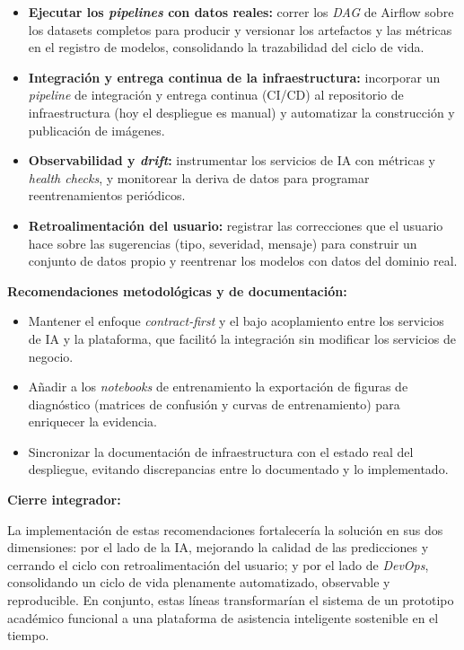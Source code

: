 \begin{itemize}\itemsep=1pt
    \item \textbf{Ejecutar los \textit{pipelines} con datos reales:} correr los \textit{DAG} de Airflow sobre los datasets completos para producir y versionar los artefactos y las métricas en el registro de modelos, consolidando la trazabilidad del ciclo de vida.
    \item \textbf{Integración y entrega continua de la infraestructura:} incorporar un \textit{pipeline} de integración y entrega continua (CI/CD) al repositorio de infraestructura (hoy el despliegue es manual) y automatizar la construcción y publicación de imágenes.
    \item \textbf{Observabilidad y \textit{drift}:} instrumentar los servicios de \acrshort{IA} con métricas y \textit{health checks}, y monitorear la deriva de datos para programar reentrenamientos periódicos.
    \item \textbf{Retroalimentación del usuario:} registrar las correcciones que el usuario hace sobre las sugerencias (tipo, severidad, mensaje) para construir un conjunto de datos propio y reentrenar los modelos con datos del dominio real.
\end{itemize}

\vspace{0.5em}

\textbf{Recomendaciones metodológicas y de documentación:}

\begin{itemize}\itemsep=1pt
    \item Mantener el enfoque \textit{contract-first} y el bajo acoplamiento entre los servicios de \acrshort{IA} y la plataforma, que facilitó la integración sin modificar los servicios de negocio.
    \item Añadir a los \textit{notebooks} de entrenamiento la exportación de figuras de diagnóstico (matrices de confusión y curvas de entrenamiento) para enriquecer la evidencia.
    \item Sincronizar la documentación de infraestructura con el estado real del despliegue, evitando discrepancias entre lo documentado y lo implementado.
\end{itemize}

\vspace{0.5em}

\textbf{Cierre integrador:}

\vspace{0.3em}

La implementación de estas recomendaciones fortalecería la solución en sus dos dimensiones: por el lado de la \acrshort{IA}, mejorando la calidad de las predicciones y cerrando el ciclo con retroalimentación del usuario; y por el lado de \textit{DevOps}, consolidando un ciclo de vida plenamente automatizado, observable y reproducible. En conjunto, estas líneas transformarían el sistema de un prototipo académico funcional a una plataforma de asistencia inteligente sostenible en el tiempo.
